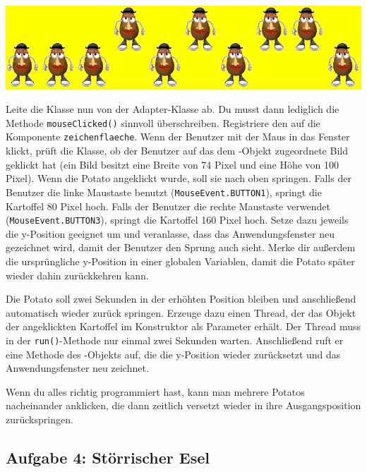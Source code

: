 \includegraphics[width=1.0\textwidth]{./inf/SEKII/26_Java_Threads/JumpingPotatoes.png}

Leite die Klasse  nun von der Adapter-Klasse
 ab. Du musst dann lediglich die Methode
\lstinline|mouseClicked()| sinnvoll überschreiben. Registriere den
 auf die Komponente \lstinline|zeichenflaeche|. Wenn der
Benutzer mit der Maus in das Fenster klickt, prüft die Klasse, ob der Benutzer
auf das dem -Objekt zugeordnete Bild geklickt hat (ein Bild
besitzt eine Breite von 74 Pixel und eine Höhe von 100 Pixel). Wenn die Potato
angeklickt wurde, soll sie nach oben springen. Falls der Benutzer die linke
Maustaste benutzt (\lstinline|MouseEvent.BUTTON1|), springt die Kartoffel 80
Pixel hoch. Falls der Benutzer die rechte Maustaste verwendet
(\lstinline|MouseEvent.BUTTON3|), springt die Kartoffel 160 Pixel hoch. Setze
dazu jeweils die y-Position geeignet um und veranlasse, dass das
Anwendungsfenster neu gezeichnet wird, damit der Benutzer den Sprung auch
sieht. Merke dir außerdem die ursprüngliche y-Position in einer globalen
Variablen, damit die Potato später wieder dahin zurückkehren kann.

Die Potato soll zwei Sekunden in der erhöhten Position bleiben und anschließend
automatisch wieder zurück springen. Erzeuge dazu einen Thread, der das Objekt
der angeklickten Kartoffel im Konstruktor als Parameter erhält. Der Thread muss
in der \lstinline|run()|-Methode nur einmal zwei Sekunden warten. Anschließend
ruft er eine Methode des -Objekts auf, die die y-Position wieder
zurücksetzt und das Anwendungsfenster neu zeichnet.

Wenn du alles richtig programmiert hast, kann man mehrere Potatos nacheinander
anklicken, die dann zeitlich versetzt wieder in ihre Ausgangsposition
zurückspringen.


\subsection{Aufgabe 4: Störrischer Esel}

